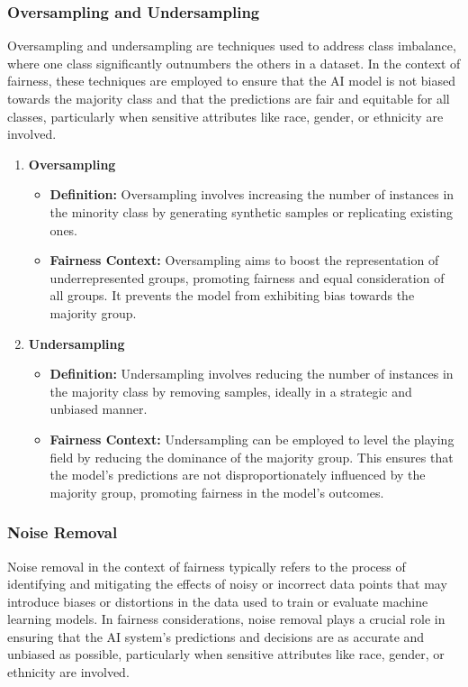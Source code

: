 \documentclass[12pt,a4paper,openright,twoside]{book}
\begin{document}
\subsubsection{Oversampling and Undersampling}
Oversampling and undersampling are techniques used to address class imbalance, where one class significantly outnumbers the others in a dataset. In the context of fairness, these techniques are employed to ensure that the AI model is not biased towards the majority class and that the predictions are fair and equitable for all classes, particularly when sensitive attributes like race, gender, or ethnicity are involved. \cite{9442706}
\begin{enumerate}
    \item \textbf{Oversampling}

    \begin{itemize}
        \item \textbf{Definition:} Oversampling involves increasing the number of instances in the minority class by generating synthetic samples or replicating existing ones.
        \item \textbf{Fairness Context:} Oversampling aims to boost the representation of underrepresented groups, promoting fairness and equal consideration of all groups. It prevents the model from exhibiting bias towards the majority group.
    \end{itemize}

    \item \textbf{Undersampling}

    \begin{itemize}
        \item \textbf{Definition:} Undersampling involves reducing the number of instances in the majority class by removing samples, ideally in a strategic and unbiased manner.
        \item \textbf{Fairness Context:} Undersampling can be employed to level the playing field by reducing the dominance of the majority group. This ensures that the model's predictions are not disproportionately influenced by the majority group, promoting fairness in the model's outcomes.
    \end{itemize}

\end{enumerate}

\subsubsection{Noise Removal}
Noise removal in the context of fairness typically refers to the process of identifying and mitigating the effects of noisy or incorrect data points that may introduce biases or distortions in the data used to train or evaluate machine learning models. In fairness considerations, noise removal plays a crucial role in ensuring that the AI system's predictions and decisions are as accurate and unbiased as possible, particularly when sensitive attributes like race, gender, or ethnicity are involved. \cite{NEURIPS2019_8d5e957f}
\end{document}
